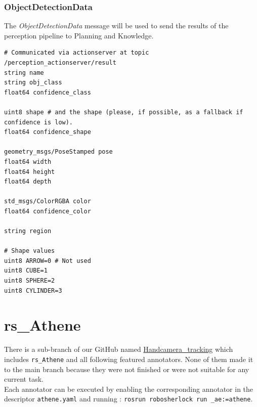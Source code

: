 \documentclass[main.tex]{subfiles}
\begin{document}
\subsubsection{ObjectDetectionData}
The \textit{ObjectDetectionData} message will be used to send the results of the perception pipeline to Planning and Knowledge.

\begin{lstlisting}
# Communicated via actionserver at topic /perception_actionserver/result
string name
string obj_class
float64 confidence_class

uint8 shape # and the shape (please, if possible, as a fallback if confidence is low). 
float64 confidence_shape

geometry_msgs/PoseStamped pose
float64 width
float64 height
float64 depth

std_msgs/ColorRGBA color
float64 confidence_color

string region

# Shape values
uint8 ARROW=0 # Not used
uint8 CUBE=1
uint8 SPHERE=2
uint8 CYLINDER=3
\end{lstlisting}

            \section{rs\_Athene}
There is a sub-branch of our GitHub named \href{https://github.com/SUTURO/suturo_perception/tree/Handcamera_tracking}{Handcamera\_tracking}
which includes \texttt{rs\_Athene} and all following featured annotators. 
None of them made it to the main branch because they were not finished or were not suitable for any current task. \\
Each annotator can be executed by enabling the corresponding annotator in the descriptor \texttt{athene.yaml} and running : \texttt{rosrun robosherlock run \_ae:=athene}. 
\end{document}
